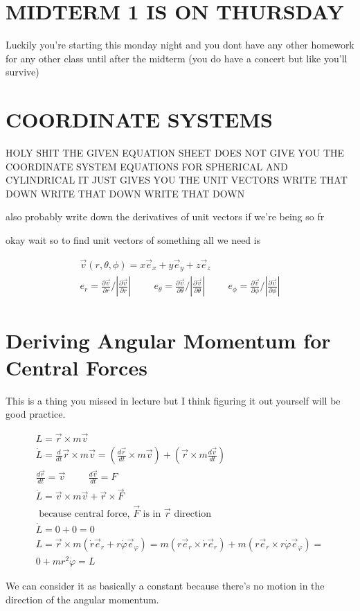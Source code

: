 \documentclass[fleqn]{article}
\date{Fall 2024}
\newcommand{\hp}{\hspace{1cm}}
\newcommand{\del}{\partial}
\newcommand{\equations} [1] {
\begin{gather*}
#1
\end{gather*}
}
\begin{document}
\pagestyle{empty}

\section{MIDTERM 1 IS ON THURSDAY}
Luckily you're starting this monday night and you dont have any other homework for any other class until after the midterm (you do have a concert but like you'll survive)

\section{COORDINATE SYSTEMS}
HOLY SHIT THE GIVEN EQUATION SHEET DOES NOT GIVE YOU THE COORDINATE SYSTEM EQUATIONS FOR SPHERICAL AND CYLINDRICAL IT JUST GIVES YOU THE UNIT VECTORS WRITE THAT DOWN WRITE THAT DOWN WRITE THAT DOWN 

also probably write down the derivatives of unit vectors if we're being so fr 

okay wait so to find unit vectors of something all we need is 
\equations{
    \vec v(r, \theta, \phi) = x \vec e_x + y \vec e_y + z \vec e_z
    \\
    e_r = \frac{\del \vec v}{\del r} / |\frac{\del \vec v}{\del r}|
    \hp
    e_\theta = \frac{\del \vec v}{\del \theta} / |\frac{\del \vec v}{\del \theta}|
    \hp
    e_\phi = \frac{\del \vec v}{\del \phi} / |\frac{\del \vec v}{\del \phi}|
}

\section{Deriving Angular Momentum for Central Forces}
This is a thing you missed in lecture but I think figuring it out yourself will be good practice. 

\equations{
    L = \vec r \times m \vec v
    \\
    \dot L = \frac{d}{dt} \vec r \times m \vec v = 
    (\frac{d \vec r}{dt} \times m \vec v ) + (\vec r \times m \frac{d \vec v}{dt})
    \\
    \frac{d \vec r}{dt} = \vec v \hp \frac{d \vec v}{dt} = F
    \\
    \dot L = \vec v \times m \vec v + \vec r \times \vec F 
    \\
    \textrm{ because central force, $\vec F$ is in $\vec r$ direction}
    \\
    \dot L = 0 + 0 = 0 
    \\
    L = \vec r \times m(\dot r \vec e_r + r \dot \varphi \vec e_\varphi)
    =
    m(r \vec e_r \times \dot r \vec e_r) + m(r \vec e_r \times r \dot \varphi \vec e_\varphi)
    =
    \\
    0 + mr^2 \dot \varphi = L
}
We can consider it as basically a constant because there's no motion in the direction of the angular momentum. 
\end{document}
